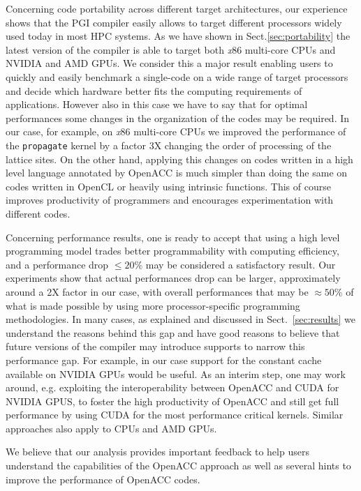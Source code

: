 \documentclass[times]{cpeauth}
\begin{document}
Concerning code portability across different target architectures, our 
experience shows that the PGI compiler easily allows to target different processors 
widely used today in most HPC systems. 
%
As we have shown in Sect.\ref{sec:portability} the latest version of the compiler 
is able to target both {\em x}86 multi-core CPUs and NVIDIA and AMD GPUs. 
%
We consider this a major result enabling users to quickly and easily benchmark a
single-code  on a wide range of target processors and decide which hardware
better fits the computing  requirements of applications.
%
However also in this case we have to say that for optimal performances some
changes in the organization of the codes may be required. 
%
In our case, for example, on {\em x}86 multi-core CPUs we improved the
performance of the {\tt propagate}  kernel by a factor 3X changing the order of
processing of the lattice sites.
%
On the other hand, applying this changes on codes written in a high level language 
annotated by OpenACC is much simpler than doing the same on codes
written in OpenCL or heavily using intrinsic functions.
%
This of course improves productivity of programmers and encourages 
experimentation with different codes.
 
Concerning performance results, one is ready to accept that using a high  
level programming model trades better programmability with computing 
efficiency, and a performance drop $\le 20\%$ may be considered a 
satisfactory result. 
%
Our experiments show that actual performances drop can be larger, 
approximately around a 2X factor in our case, with overall performances 
that may be $\approx 50$\% of what is made possible by using more 
processor-specific programming methodologies. 
%   
In many cases, as explained and discussed in Sect.~\ref{sec:results} 
we understand the reasons behind this gap and have good reasons to believe 
that future versions of the compiler may introduce supports to narrow 
this performance gap. 
%
For example, in our case support for the constant cache available on NVIDIA
GPUs would be useful.
%
As an interim step, one may work around, e.g. exploiting 
the interoperability between OpenACC and CUDA for NVIDIA GPUS,  
to foster the high productivity of OpenACC and still get full 
performance by using CUDA for the most performance critical kernels. 
Similar approaches also apply to CPUs and AMD GPUs.

We believe that our analysis provides important feedback to help users 
understand the capabilities of the OpenACC approach as well as several hints 
to improve the performance of OpenACC codes. 
\end{document}
